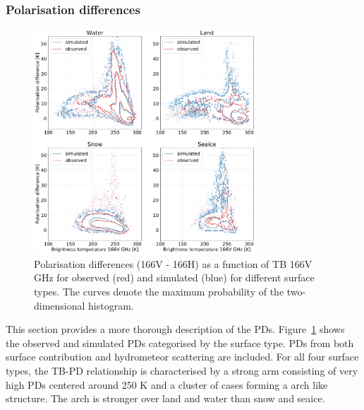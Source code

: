 \documentclass[amt, manuscript]{copernicus}
\begin{document}

\subsubsection{Polarisation differences}
\label{sec:PD}

\begin{figure}[t]
	\includegraphics[width=8.3cm]{Figures/hist2d_all_surface_jan.pdf}
	\caption{Polarisation differences (166V - 166H) as a function of
		TB 166V GHz for observed (red) and simulated (blue) for
		different surface types. The curves denote the maximum probability of the two-dimensional histogram.}
	\label{fig:PD}
\end{figure}

This section provides a more thorough description of the PDs.  Figure~\ref{fig:PD} shows the observed and simulated PDs categorised by the surface type. PDs from both surface contribution and hydrometeor scattering are included. For all four surface types, the TB-PD relationship is characterised by a strong arm consisting of very high PDs centered around 250\,\,K and a cluster of cases forming a arch like structure. The arch is stronger over land and water than snow and seaice. 
\end{document}

